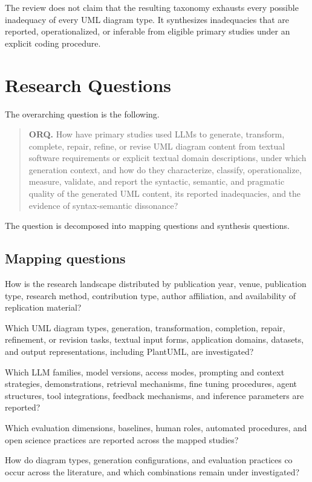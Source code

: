 The review does not claim that the resulting taxonomy exhausts every possible inadequacy of every UML diagram type. It synthesizes inadequacies that are reported, operationalized, or inferable from eligible primary studies under an explicit coding procedure.

\section{Research Questions}
\label{sec:protocol_questions}

The overarching question is the following.

\begin{quote}
\textbf{ORQ.} How have primary studies used LLMs to generate, transform, complete, repair, refine, or revise UML diagram content from textual software requirements or explicit textual domain descriptions, under which generation context, and how do they characterize, classify, operationalize, measure, validate, and report the syntactic, semantic, and pragmatic quality of the generated UML content, its reported inadequacies, and the evidence of syntax-semantic dissonance?
\end{quote}

The question is decomposed into mapping questions and synthesis questions.

\subsection{Mapping questions}

\begin{description}[style=nextline,leftmargin=2.0cm,labelwidth=1.5cm]
    \item[MQ1.] How is the research landscape distributed by publication year, venue, publication type, research method, contribution type, author affiliation, and availability of replication material?
    \item[MQ2.] Which UML diagram types, generation, transformation, completion, repair, refinement, or revision tasks, textual input forms, application domains, datasets, and output representations, including PlantUML, are investigated?
    \item[MQ3.] Which LLM families, model versions, access modes, prompting and context strategies, demonstrations, retrieval mechanisms, fine tuning procedures, agent structures, tool integrations, feedback mechanisms, and inference parameters are reported?
    \item[MQ4.] Which evaluation dimensions, baselines, human roles, automated procedures, and open science practices are reported across the mapped studies?
    \item[MQ5.] How do diagram types, generation configurations, and evaluation practices co occur across the literature, and which combinations remain under investigated?
\end{description}

